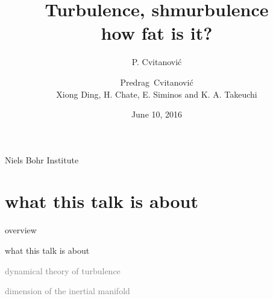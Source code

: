 




\title{\huge Turbulence, shmurbulence  \\ how fat is it?}
\author{P. Cvitanovi\'c}
\author[Cvitanovi\'c]
{
  \textcolor{green!50!black}{
  {Predrag~Cvitanovi\'c \\
  Xiong Ding, H. Chate, E. Siminos and K. A. Takeuchi
  }	%
  }
}
\institute
{
Niels Bohr Institute
 }
\date{June 10, 2016}



\begin{frame}
  \titlepage
\end{frame}


\section[what this talk is about]
 {what this talk is about}

\begin{frame}{overview}
\begin{enumerate}
              \item {\Large
what this talk is about
                  }\textcolor{gray}{\small
              \item
dynamical theory of turbulence
              \item
\statesp
              \item
dimension of the inertial manifold
                    }
            \end{enumerate}
\end{frame}



